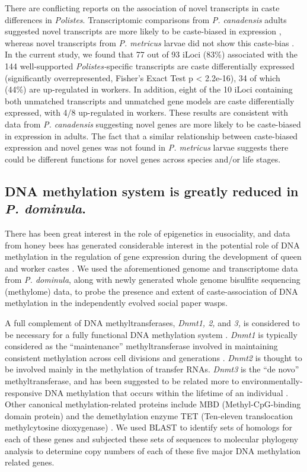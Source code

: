 There are conflicting reports on the association of novel transcripts in
caste differences in \textit{Polistes}. Transcriptomic comparisons from
\textit{P. canadensis} adults suggested novel transcripts are more likely
to be caste-biased in expression \cite{PcanTrans},
whereas novel transcripts from \textit{P. metricus} larvae did not show
this caste-bias \cite{Berens2015}. In the current study, we found that 77 out of 93 iLoci (83\%)
associated with the 144 well-supported \textit{Polistes-}specific
transcripts are caste differentially expressed (significantly
overrepresented, Fisher's Exact Test p \textless{} 2.2e-16), 34 of which
(44\%) are up-regulated in workers. In addition, eight of the 10 iLoci
containing both unmatched transcripts and unmatched gene models are
caste differentially expressed, with 4/8 up-regulated in workers. These
results are consistent with data from \textit{P. canadensis} \cite{PcanTrans}
suggesting novel genes are more likely to be caste-biased in expression
in adults. The fact that a similar relationship between caste-biased
expression and novel genes was not found in \textit{P. metricus} larvae
suggests there could be different functions for novel genes across
species and/or life stages.

\subsection{DNA methylation system is greatly reduced in \textit{P.
dominula}.} There has been great interest in the role of epigenetics in
eusociality, and data from honey bees has generated considerable
interest in the potential role of DNA methylation in the regulation of
gene expression during the development of queen and worker castes
\cite{Lyko2011}. We used
the aforementioned genome and transcriptome data from \textit{P.
dominula}, along with newly generated whole genome bisulfite sequencing
(methylome) data, to probe the presence and extent of caste-association
of DNA methylation in the independently evolved social paper wasps.

A full complement of DNA methyltransferases, \textit{Dnmt1, 2,} and
\textit{3,} is considered to be necessary for a fully functional DNA
methylation system \cite{Lyko2011}. \textit{Dnmt1} is typically considered as the ``maintenance''
methyltransferase involved in maintaining consistent methylation across
cell divisions and generations \cite{Lyko2011}. \textit{Dnmt2} is thought to be involved mainly in the
methylation of transfer RNAs. \textit{Dnmt3} is the ``de novo''
methyltransferase, and has been suggested to be related more to
environmentally-responsive DNA methylation that occurs within the
lifetime of an individual \cite{Lyko2011}. Other canonical methylation-related proteins include
MBD (Methyl-CpG-binding domain protein) and the demethylation enzyme TET
(Ten-eleven translocation methylcytosine dioxygenase) \cite{Lyko2011}. We used
BLAST to identify sets of homologs for each of these genes and subjected
these sets of sequences to molecular phylogeny analysis to determine
copy numbers of each of these five major DNA methylation related genes.

